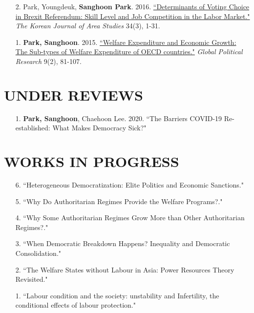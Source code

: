 \documentclass[11pt]{res} %
\begin{document}
\begin{resume}
\begin{enumerate}[leftmargin=*]
	\item[2.] Park, Youngdeuk, \textbf{Sanghoon Park}. 2016. \href{http://kiss.kstudy.com/thesis/thesis-view.asp?key=3472800}{``Determinants of Voting Choice in Brexit Referendum: Skill Level and Job Competition in the Labor Market."} \textit{The Korean Journal of Area Studies} 34(3), 1-31.	
	\item[1.] \textbf{Park, Sanghoon}. 2015. \href{http://search.koreanstudies.net/thesis/thesis-view.asp?key=3438155}{``Welfare Expenditure and Economic Growth: The Sub-types of Welfare Expenditure of OECD countries."} \textit{Global Political Research} 9(2), 81-107.	
\end{enumerate}

\section{UNDER REVIEWS}
\begin{enumerate}[leftmargin=*]
	\item[1.] \textbf{Park, Sanghoon}, Chaehoon Lee. 2020. ``The Barriers COVID-19 Re-established: What Makes Democracy Sick?"
\end{enumerate}

\section{WORKS IN PROGRESS}
\begin{enumerate}[leftmargin=*]
	\item[6.] ``Heterogeneous Democratization: 	Elite Politics and Economic Sanctions."
	\item[5.] ``Why Do Authoritarian Regimes Provide the Welfare Programs?."
	\item[4.] ``Why Some Authoritarian Regimes Grow More than Other Authoritarian Regimes?."
	\item[3.] ``When Democratic Breakdown Happens? Inequality and Democratic Consolidation."
	\item[2.] ``The Welfare States without Labour in Asia: Power Resources Theory Revisited."
	\item[1.] ``Labour condition and the society: unstability and Infertility, the conditional effects of labour protection."
\end{enumerate}


\end{resume}
\end{document}
